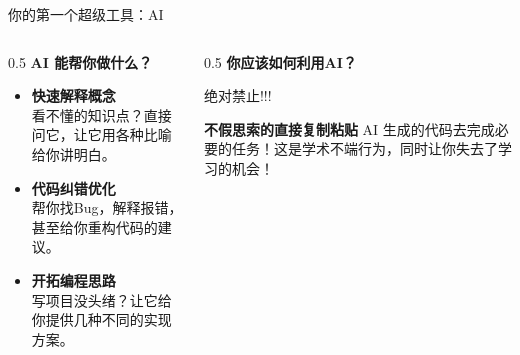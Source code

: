 \documentclass{beamer}
\begin{document}
\begin{frame}{你的第一个超级工具：AI}
    \begin{columns}[T]
        \begin{column}{0.5\textwidth}
            \Large\textbf{AI 能帮你做什么？}
            \begin{itemize}
                \item \textbf{快速解释概念} \\
                \small 看不懂的知识点？直接问它，让它用各种比喻给你讲明白。
                \item \textbf{代码纠错优化} \\
                \small 帮你找Bug，解释报错，甚至给你重构代码的建议。
                \item \textbf{开拓编程思路} \\
                \small 写项目没头绪？让它给你提供几种不同的实现方案。
            \end{itemize}
        \end{column}
        
        \begin{column}{0.5\textwidth}
            \Large\textbf{你应该如何利用AI？}
            \vspace{0.3cm}

            
            \begin{alertblock}{绝对禁止!!!}

            \textbf{不假思索的直接复制粘贴} AI 生成的代码去完成必要的任务！这是\alert{学术不端}行为，同时让你失去了学习的机会！

            \end{alertblock}

        \end{column}
    \end{columns}
\end{frame}
\end{document}
